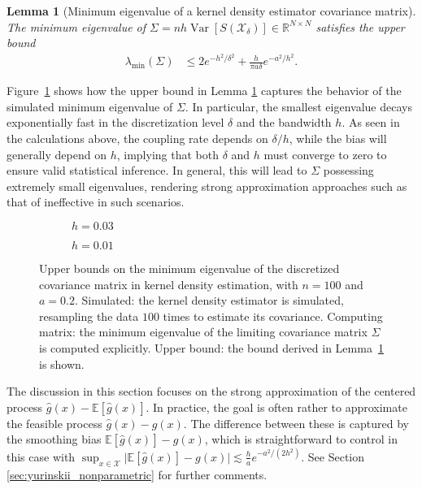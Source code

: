 \documentclass[11pt,lof]{puthesis}
\newcommand{\R}{\ensuremath{\mathbb{R}}}
\newcommand{\E}{\ensuremath{\mathbb{E}}}
\newcommand{\cX}{\ensuremath{\mathcal{X}}}
\DeclareMathOperator{\Var}{Var}
\theoremstyle{break}
\newtheorem{lemma}{Lemma}[section]
\theoremstyle{proof}
\begin{document}
\begin{lemma}[Minimum eigenvalue of a
kernel density estimator covariance matrix]%
\label{lem:yurinskii_kde_eigenvalue}
%
The minimum eigenvalue of
$\Sigma=n h\Var[S(\cX_\delta)] \in \R^{N \times N}$
satisfies the upper bound
%
\begin{align*}
\lambda_{\min}(\Sigma)
&\leq
2 e^{-h^2/\delta^2}
+ \frac{h}{\pi a \delta}
e^{-a^2 / h^2}.
\end{align*}
\end{lemma}
%
Figure~\ref{fig:yurinskii_min_eig} shows how the upper bound in Lemma
\ref{lem:yurinskii_kde_eigenvalue} captures the behavior of the simulated
minimum
eigenvalue of $\Sigma$. In particular, the smallest eigenvalue decays
exponentially fast in the discretization level $\delta$ and the bandwidth $h$.
As seen in the calculations above, the coupling rate depends on $\delta / h$,
while the bias will generally depend on $h$, implying that both $\delta$ and
$h$ must converge to zero to ensure valid statistical inference. In general,
this will lead to $\Sigma$ possessing extremely small eigenvalues, rendering
strong approximation approaches such as that of \citet{li2020uniform}
ineffective in such scenarios.
%
\begin{figure}[t]
\centering
\begin{subfigure}{0.49\textwidth}
\centering
\caption{$h = 0.03$}
\end{subfigure}
\begin{subfigure}{0.49\textwidth}
\centering
\caption{$h = 0.01$}
\end{subfigure}
\caption[Minimum eigenvalue of the kernel density covariance matrix]{
Upper bounds on the minimum eigenvalue of the discretized covariance
matrix in kernel density estimation,
with $n=100$ and $a = 0.2$.
Simulated: the kernel density estimator is simulated,
resampling the data $100$ times
to estimate its covariance.
Computing matrix: the minimum eigenvalue of the limiting covariance
matrix $\Sigma$ is computed explicitly.
Upper bound: the bound derived in
Lemma~\ref{lem:yurinskii_kde_eigenvalue}
is shown.
}
\label{fig:yurinskii_min_eig}
\end{figure}

The discussion in this section focuses on the strong approximation of the
centered process $\hat g(x)-\E [ \hat g(x) ]$. In practice, the goal is often
rather to approximate the feasible process $\hat g(x)- g(x)$. The difference
between these is captured by the smoothing bias $\E [ \hat g(x) ] - g(x)$,
which is straightforward to control in this case with
$\sup_{x \in \cX} \big| \E [ \hat g(x) ] - g(x) \big|
\lesssim \frac{h}{a} e^{-a^2 / (2 h^2)}$.
See Section \ref{sec:yurinskii_nonparametric} for further
comments.
\end{document}
